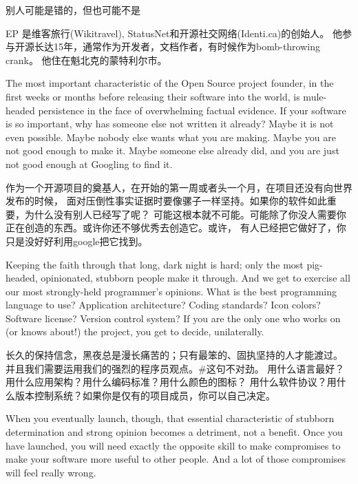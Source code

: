 {别人可能是错的，但也可能不是}

{
EP 是维客旅行(Wikitravel), StatusNet和开源社交网络(Identi.ca)的创始人。
他参与开源长达15年，通常作为开发者，文档作者，有时候作为bomb-throwing crank。
他住在魁北克的蒙特利尔市。
}

\noindent{}The most important characteristic of the Open Source project founder, in the
first weeks or months before releasing their software into the world, is
mule-headed persistence in the face of overwhelming factual evidence. If your
software is so important, why has someone else not written it already? Maybe it is not even possible. Maybe nobody else wants what you are making. Maybe you are not good enough to make it. Maybe someone else already did, and you are just not good enough at Googling to find it.

作为一个开源项目的奠基人，在开始的第一周或者头一个月，在项目还没有向世界发布的时候，
面对压倒性事实证据时要像骡子一样坚持。如果你的软件如此重要，为什么没有别人已经写了呢？
可能这根本就不可能。可能除了你没人需要你正在创造的东西。或许你还不够优秀去创造它。或许，
有人已经把它做好了，你只是没好好利用google把它找到。

Keeping the faith through that long, dark night is hard; only the most
pig-headed, opinionated, stubborn people make it through. And we get to exercise
all our most strongly-held programmer's opinions. What is the best programming
language to use? Application architecture? Coding standards? Icon colors?
Software license? Version control system? If you are the only one who works on
(or knows about!) the project, you get to decide, unilaterally.

长久的保持信念，黑夜总是漫长痛苦的；只有最笨的、固执坚持的人才能渡过。
并且我们需要运用我们的强烈的程序员观点。#这句不对劲。
用什么语言最好？用什么应用架构？用什么编码标准？用什么颜色的图标？
用什么软件协议？用什么版本控制系统？如果你是仅有的项目成员，你可以自己决定。

When you eventually launch, though, that essential characteristic of stubborn
determination and strong opinion becomes a detriment, not a benefit. Once you have launched, you will need exactly the opposite skill to make compromises to make your software more useful to other people. And a lot of those compromises will feel really wrong.


